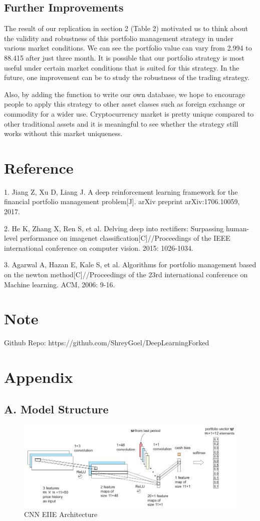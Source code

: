 \documentclass[11pt]{paper}
\begin{document}
	\subsection{Further Improvements}
	The result of our replication in section 2 (Table 2) motivated us to think about the validity and robustness of this portfolio management strategy in under various market conditions. We can see the portfolio value can vary from 2.994 to 88.415 after just three month. It is possible that our portfolio strategy is most useful under certain market conditions that is suited for this strategy. In the future, one improvement can be to study the robustness of the trading strategy.

	Also, by adding the function to write our own database, we hope to encourage people to apply this strategy to other asset classes such as foreign exchange or commodity for a wider use. Cryptocurrency market is pretty unique compared to other traditional assets and it is meaningful to see whether the strategy still works without this market uniqueness.

	\section*{Reference}
	1. Jiang Z, Xu D, Liang J. A deep reinforcement learning framework for the financial portfolio management problem[J]. arXiv preprint arXiv:1706.10059, 2017.

	2. He K, Zhang X, Ren S, et al. Delving deep into rectifiers: Surpassing human-level performance on imagenet classification[C]//Proceedings of the IEEE international conference on computer vision. 2015: 1026-1034.

	3. Agarwal A, Hazan E, Kale S, et al. Algorithms for portfolio management based on the newton method[C]//Proceedings of the 23rd international conference on Machine learning. ACM, 2006: 9-16.
	\section*{Note}
	Github Repo: https://github.com/ShreyGoel/DeepLearningForked\newpage
	\section*{Appendix}
	\subsection* {A. Model Structure}
			\begin{figure}[h]
			\centering  
			\includegraphics[width=0.7\linewidth]{cnn.png} 
			\caption{CNN EIIE Architecture} 
			\label{fig:cnn}   
		\end{figure}
\end{document}
